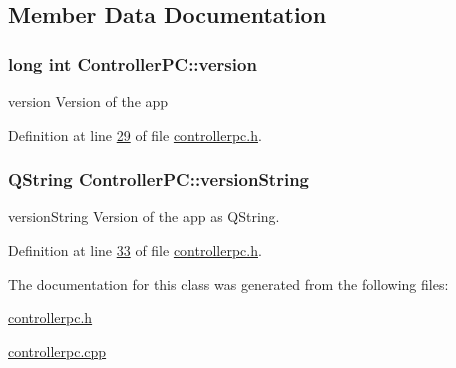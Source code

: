 \subsection{Member Data Documentation}
\hypertarget{class_controller_p_c_a9eb43c34237d66751a6411e55cf5f55e}{
\subsubsection[{version}]{\setlength{\rightskip}{0pt plus 5cm}long int Controller\-P\-C\-::version}}\label{class_controller_p_c_a9eb43c34237d66751a6411e55cf5f55e}


version Version of the app 



Definition at line \hyperlink{controllerpc_8h_source_l00029}{29} of file \hyperlink{controllerpc_8h_source}{controllerpc.\-h}.

\hypertarget{class_controller_p_c_a0e63cca37d6ce2e660f3380400c2c5f3}{
\subsubsection[{version\-String}]{\setlength{\rightskip}{0pt plus 5cm}Q\-String Controller\-P\-C\-::version\-String}}\label{class_controller_p_c_a0e63cca37d6ce2e660f3380400c2c5f3}


version\-String Version of the app as Q\-String. 



Definition at line \hyperlink{controllerpc_8h_source_l00033}{33} of file \hyperlink{controllerpc_8h_source}{controllerpc.\-h}.



The documentation for this class was generated from the following files\-:\begin{DoxyCompactItemize}
\item 
\hyperlink{controllerpc_8h}{controllerpc.\-h}\item 
\hyperlink{controllerpc_8cpp}{controllerpc.\-cpp}\end{DoxyCompactItemize}

